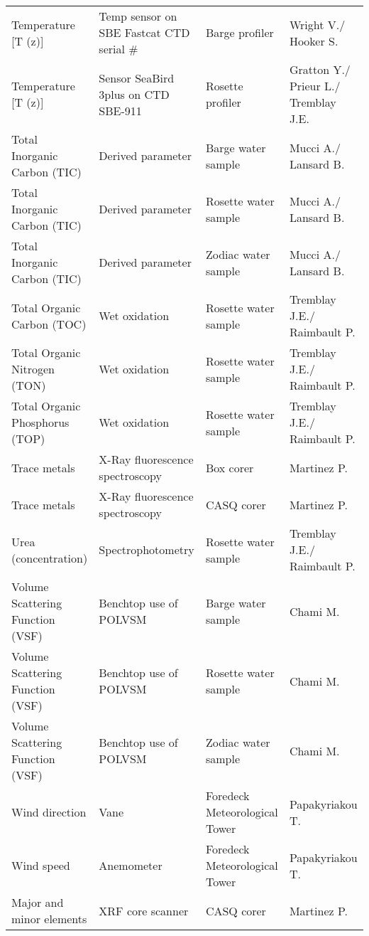 \begin{longtable}[t]{llll}
Temperature [T (z)] & Temp sensor on SBE Fastcat CTD serial \# & Barge profiler & Wright V./ Hooker S.\\
\addlinespace
Temperature [T (z)] & Sensor SeaBird 3plus on CTD SBE-911 & Rosette profiler & Gratton Y./ Prieur L./ Tremblay J.E.\\
Total Inorganic Carbon (TIC) & Derived parameter & Barge water sample & Mucci A./ Lansard B.\\
Total Inorganic Carbon (TIC) & Derived parameter & Rosette water sample & Mucci A./ Lansard B.\\
Total Inorganic Carbon (TIC) & Derived parameter & Zodiac water sample & Mucci A./ Lansard B.\\
Total Organic Carbon (TOC) & Wet oxidation & Rosette water sample & Tremblay J.E./ Raimbault P.\\
\addlinespace
Total Organic Nitrogen (TON) & Wet oxidation & Rosette water sample & Tremblay J.E./ Raimbault P.\\
Total Organic Phosphorus (TOP) & Wet oxidation & Rosette water sample & Tremblay J.E./ Raimbault P.\\
Trace metals & X-Ray fluorescence spectroscopy & Box corer & Martinez P.\\
Trace metals & X-Ray fluorescence spectroscopy & CASQ corer & Martinez P.\\
Urea (concentration) & Spectrophotometry & Rosette water sample & Tremblay J.E./ Raimbault P.\\
\addlinespace
Volume Scattering Function (VSF) & Benchtop use of POLVSM & Barge water sample & Chami M.\\
Volume Scattering Function (VSF) & Benchtop use of POLVSM & Rosette water sample & Chami M.\\
Volume Scattering Function (VSF) & Benchtop use of POLVSM & Zodiac water sample & Chami M.\\
Wind direction & Vane & Foredeck Meteorological Tower & Papakyriakou T.\\
Wind speed & Anemometer & Foredeck Meteorological Tower & Papakyriakou T.\\
\addlinespace
Major and minor elements & XRF core scanner & CASQ corer & Martinez P.\\*
\end{longtable}
\endgroup{}
